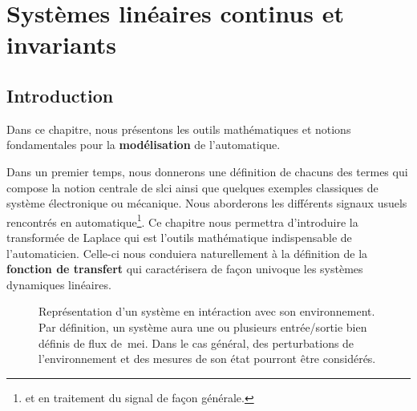 \chapter[Systèmes linéaires, continus\ldots]{Systèmes linéaires continus et invariants\label{chap-slci}}
\adjustmtc
\minitoc
\newpage
\section{Introduction}
Dans ce chapitre, nous présentons les outils mathématiques 
et notions fondamentales pour la \textbf{modélisation} de l'automatique.

Dans un premier temps, nous donnerons une définition de chacuns 
des termes qui compose la notion centrale de \gls{slci} ainsi que quelques
exemples classiques de système électronique ou mécanique.
Nous aborderons les différents signaux usuels rencontrés
en automatique\footnote{et en traitement du signal de façon générale.}.
Ce chapitre nous permettra d'introduire la transformée de Laplace qui 
est l'outils mathématique indispensable de l'automaticien.
Celle-ci nous conduiera naturellement à la définition 
de la \textbf{fonction de transfert} qui caractérisera de façon univoque 
les systèmes dynamiques linéaires.

\begin{figure}[!h]
\begin{center}
    
\end{center}
\caption{Représentation d'un système en intéraction avec son environnement. 
         Par définition, un système aura une ou plusieurs entrée/sortie bien 
		 définis de flux de~\gls{mei}. Dans le cas général, des perturbations 
		 de l'environnement et des mesures de son état pourront être considérés.
		 \label{fig-systeme}}
\end{figure}

